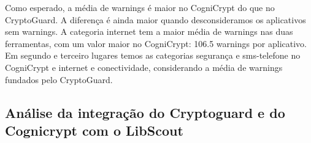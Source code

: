 Como esperado, a média de warnings é maior no CogniCrypt do que no CryptoGuard. A diferença é ainda maior quando desconsideramos os aplicativos sem warnings. A categoria internet tem a maior média de warnings nas duas ferramentas, com um valor maior no CogniCrypt: 106.5 warnings por aplicativo. Em segundo e terceiro lugares temos as categorias segurança e sms-telefone no CogniCrypt e internet e conectividade, considerando a média de warnings fundados pelo CryptoGuard.

\subsection{Análise da integração do Cryptoguard e do Cognicrypt com o LibScout}









